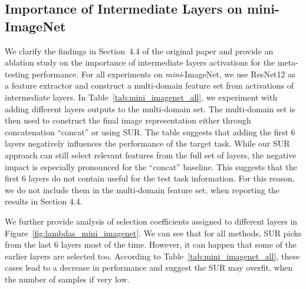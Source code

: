 \documentclass[runningheads]{llncs}
\begin{document}
\subsection{Importance of Intermediate Layers on mini-ImageNet}
We clarify the findings in Section~4.4 of the original paper
and provide an ablation study on the importance of intermediate layers
activations for the meta-testing performance. For all experiments on \textit{mini}-ImageNet, we
use ResNet12 as a feature extractor and construct a multi-domain feature set from
activations of intermediate layers. In Table~\ref{tab:mini_imagenet_all}, we
experiment with adding different layers outputs to the multi-domain set. The
multi-domain set is then used to
construct the final image representation either through concatenation ``concat''
or using SUR. The table suggests that adding the first 6 layers negatively
influences the performance of the target task. While our SUR approach can still
select relevant features from the full set of layers, the negative impact is
especially pronounced for the ``concat'' baseline. This suggests that the first
6 layers do not contain useful for the test task information. For this reason,
we do not include them in the multi-domain feature set, when reporting the results
in Section 4.4.

We further provide analysis of selection coefficients assigned to different layers in
Figure~\ref{fig:lambdas_mini_imagenet}. We can see that for all methods, SUR
picks from the last 6 layers most of the time. However, it can happen that some
of the earlier layers are selected too. According to
Table~\ref{tab:mini_imagenet_all}, these cases lead to a decrease in performance
and suggest the SUR may overfit, when the number of samples if very low.
 
\end{document}
